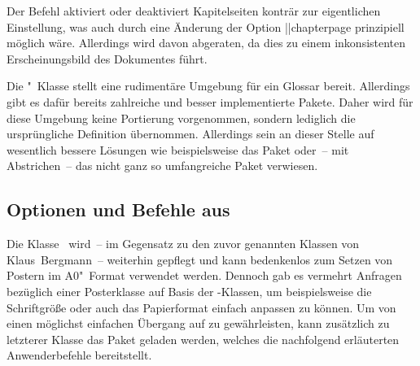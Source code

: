 \begin{DeclareEntity}{}
\begin{Declaration}
  {}
\printdeclarationlist
%
Der Befehl aktiviert oder deaktiviert Kapitelseiten konträr zur eigentlichen 
Einstellung, was auch durch eine Änderung der Option \Option||{chapterpage} 
prinzipiell möglich wäre. Allerdings wird davon abgeraten, da dies zu einem 
inkonsistenten Erscheinungsbild des Dokumentes führt.
\end{Declaration}

\begin{Declaration}
  {}
\begin{Declaration}
  {}
\printdeclarationlist
%
Die "~Klasse stellt eine rudimentäre Umgebung für ein Glossar 
bereit. Allerdings gibt es dafür bereits zahlreiche und besser implementierte 
Pakete. Daher wird für diese Umgebung keine Portierung vorgenommen, sondern 
lediglich die ursprüngliche Definition übernommen. Allerdings sein an dieser 
Stelle auf wesentlich bessere Lösungen wie beispielsweise das Paket 
 oder~-- mit Abstrichen~-- das nicht ganz so umfangreiche 
Paket  verwiesen.
\end{Declaration}
\end{Declaration}
%



\subsection{%
  Optionen und Befehle aus %
}
%
%
Die Klasse~ wird~-- im Gegensatz zu den zuvor genannten 
Klassen von Klaus~Bergmann~-- weiterhin gepflegt und kann bedenkenlos zum 
Setzen von Postern im A0"~Format verwendet werden. Dennoch gab es vermehrt 
Anfragen bezüglich einer Posterklasse auf Basis der \TUDScript-Klassen, um 
beispielsweise die Schriftgröße oder auch das Papierformat einfach anpassen zu 
können. Um von  einen möglichst einfachen Übergang auf 
 zu gewährleisten, kann zusätzlich zu letzterer Klasse das 
Paket  geladen werden, welches die nachfolgend erläuterten 
Anwenderbefehle bereitstellt.


\end{DeclareEntity}
